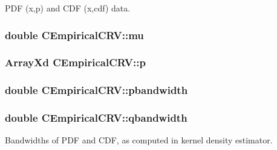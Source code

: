 P\-D\-F (x,p) and C\-D\-F (x,cdf) data. 

\hypertarget{class_c_empirical_c_r_v_a6fa15be69d72045664907de9f6c202ac}{
\subsubsection[{mu}]{\setlength{\rightskip}{0pt plus 5cm}double C\-Empirical\-C\-R\-V\-::mu\hspace{0.3cm}{\ttfamily [private]}}}\label{class_c_empirical_c_r_v_a6fa15be69d72045664907de9f6c202ac}
\hypertarget{class_c_empirical_c_r_v_ab0e5305502410acb609ba60afa5e7de5}{
\subsubsection[{p}]{\setlength{\rightskip}{0pt plus 5cm}Array\-Xd C\-Empirical\-C\-R\-V\-::p\hspace{0.3cm}{\ttfamily [private]}}}\label{class_c_empirical_c_r_v_ab0e5305502410acb609ba60afa5e7de5}
\hypertarget{class_c_empirical_c_r_v_aca50bd8bce019a6c82c2d1f65a1ec948}{
\subsubsection[{pbandwidth}]{\setlength{\rightskip}{0pt plus 5cm}double C\-Empirical\-C\-R\-V\-::pbandwidth\hspace{0.3cm}{\ttfamily [private]}}}\label{class_c_empirical_c_r_v_aca50bd8bce019a6c82c2d1f65a1ec948}
\hypertarget{class_c_empirical_c_r_v_a364ed1fc45edfa3a8569baa21de707d7}{
\subsubsection[{qbandwidth}]{\setlength{\rightskip}{0pt plus 5cm}double C\-Empirical\-C\-R\-V\-::qbandwidth\hspace{0.3cm}{\ttfamily [private]}}}\label{class_c_empirical_c_r_v_a364ed1fc45edfa3a8569baa21de707d7}


Bandwidths of P\-D\-F and C\-D\-F, as computed in kernel density estimator. 

